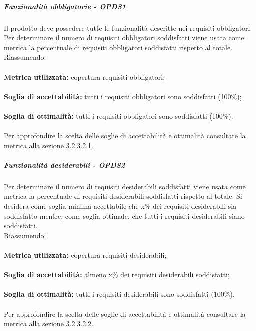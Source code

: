 \documentclass[PianoDiQualifica.tex]{subfiles}
\begin{document}
				\subparagraph{Funzionalità obbligatorie - OPDS1}
				Il prodotto deve possedere tutte le funzionalità descritte nei requisiti obbligatori. Per determinare il numero di requisiti obbligatori soddisfatti viene usata 
				come metrica la percentuale di requisiti obbligatori soddisfatti rispetto al totale. \\
				Riassumendo: \\ \\
				\textbf{Metrica utilizzata:} copertura requisiti obbligatori;\\ \\
				\textbf{Soglia di accettabilità:} tutti i requisiti obbligatori sono soddisfatti (100\%); \\ \\
				\textbf{Soglia di ottimalità:} tutti i requisiti obbligatori sono soddisfatti (100\%). \\ \\
				Per approfondire la scelta delle soglie di accettabilità e ottimalità consultare la metrica alla sezione \hyperlink{req_obbligatori}{3.2.3.2.1}.
				
				\subparagraph{Funzionalità desiderabili - OPDS2}
				Per determinare il numero di requisiti desiderabili soddisfatti viene usata come metrica la percentuale di requisiti desiderabili soddisfatti rispetto al totale.
				Si desidera come soglia minima accettabile che x\% dei requisiti desiderabili sia soddisfatto mentre, come soglia ottimale, che tutti i requisiti desiderabili siano soddisfatti. \\
				Riassumendo: \\ \\
				\textbf{Metrica utilizzata:} copertura requisiti desiderabili;\\ \\
				\textbf{Soglia di accettabilità:} almeno x\% dei requisiti desiderabili soddisfatti; \\ \\
				\textbf{Soglia di ottimalità:} tutti i requisiti desiderabili sono soddisfatti (100\%). \\ \\
				Per approfondire la scelta delle soglie di accettabilità e ottimalità consultare la metrica alla sezione \hyperlink{req_desiderabili}{3.2.3.2.2}.
				
\end{document}
